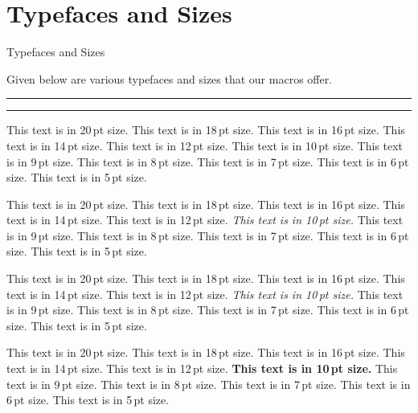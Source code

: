 {{\BlackBoxes								









 \fontss
\section{Typefaces and Sizes}{Typefaces and Sizes}

\ii Given below are various typefaces and sizes that our macros offer.\bs\hrule\kern1pt\hrule\bs


{\obeylines
{}\nopagebreak
{\twentyrm \fontss This text is in 20\,pt size.}
{\eighteenrm \fontss This text is in 18\,pt size.}
{\sixteenrm \fontss This text is in 16\,pt size.}
{\fourteenrm \fontss This text is in 14\,pt size.}
{\twelverm \fontss This text is in 12\,pt size.}
{\rm \fontss This text is in 10\,pt size.}
{\ninerm \fontss This text is in 9\,pt size.}
{\eightrm \fontss This text is in 8\,pt size.}
{\sevenrm \fontss This text is in 7\,pt size.}
{\sixrm \fontss This text is in 6\,pt size.}
{\fiverm \fontss This text is in 5\,pt size.}
\

\nopagebreak
{\twentyit \fontss This text is in 20\,pt size.}
{\eighteenit \fontss This text is in 18\,pt size.}
{\sixteenit \fontss This text is in 16\,pt size.}
{\fourteenit \fontss This text is in 14\,pt size.}
{\twelveit \fontss This text is in 12\,pt size.}
{\it \fontss This text is in 10\,pt size.}
{\nineit \fontss This text is in 9\,pt size.}
{\eightit \fontss This text is in 8\,pt size.}
{\sevenit \fontss This text is in 7\,pt size.}
{\sixit \fontss This text is in 6\,pt size.}
{\fiveit \fontss This text is in 5\,pt size.}
\

\nopagebreak
{\twentysl \fontss This text is in 20\,pt size.}
{\eighteensl \fontss This text is in 18\,pt size.}
{\sixteensl \fontss This text is in 16\,pt size.}
{\fourteensl \fontss This text is in 14\,pt size.}
{\twelvesl \fontss This text is in 12\,pt size.}
{\sl \fontss This text is in 10\,pt size.}
{\ninesl \fontss This text is in 9\,pt size.}
{\eightsl \fontss This text is in 8\,pt size.}
{\sevensl \fontss This text is in 7\,pt size.}
{\sixsl \fontss This text is in 6\,pt size.}
{\fivesl \fontss This text is in 5\,pt size.}
\

\newpage
{}\nopagebreak
{\twentybf \fontss This text is in 20\,pt size.}
{\eighteenbf \fontss This text is in 18\,pt size.}
{\sixteenbf \fontss This text is in 16\,pt size.}
{\fourteenbf \fontss This text is in 14\,pt size.}
{\twelvebf \fontss This text is in 12\,pt size.}
{\bf \fontss This text is in 10\,pt size.}
{\ninebf \fontss This text is in 9\,pt size.}
{\eightbf \fontss This text is in 8\,pt size.}
{\sevenbf \fontss This text is in 7\,pt size.}
{\sixbf \fontss This text is in 6\,pt size.}
{\fivebf \fontss This text is in 5\,pt size.}
\

}}}
